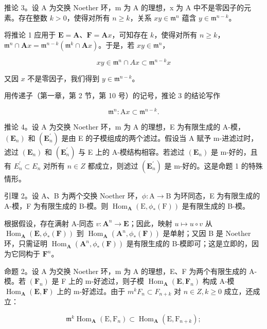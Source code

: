 推论 3。设 A 为交换 Noether 环，m 为 A 的理想，x 为 A 中不是零因子的元素。存在整数 \(k > 0\)，使得对所有 \(n \geqslant k\)，关系 \(xy \in \mathfrak{m}^n\) 蕴含 \(y \in \mathfrak{m}^{n - k}\)。

将推论 1 应用于 \(\mathbf{E} = \mathbf{A}\)、\(\mathbf{F} = \mathbf{A}x\)，可知存在 \(k\)，使得对所有 \(n \geqslant k\)，\(\mathfrak{m}^n \cap \mathbf{A}x = \mathfrak{m}^{n - k}(\mathfrak{m}^k \cap \mathbf{A}x)\)。于是，若 \(xy \in \mathfrak{m}^n\)，

\[
x y \in \mathfrak {m} ^ {n} \cap A x \subset \mathfrak {m} ^ {n - k} x
\]

又因 \(x\) 不是零因子，我们得到 \(y \in \mathfrak{m}^{n - k}\)。

用传递子（第一章，第 2 节，第 10 号）的记号，推论 3 的结论写作

\[
\mathfrak {m} ^ {n}: \mathrm{A} x \subset \mathfrak {m} ^ {n - k}.\tag{2}
\]

推论 4。设 A 为交换 Noether 环，m 为 A 的理想，E 为有限生成的 A-模，\((\mathbf{E}_{n})\) 和 \((\mathbf{E}_{n}^{\prime})\) 是由 E 的子模组成的两个滤过。假设当 A 赋予 m-进滤过时，滤过 \((\mathbf{E}_{n})\) 和 \((\mathbf{E}_{n}^{\prime})\) 与 E 上的 A-模结构相容。若滤过 \((\mathbf{E}_{n})\) 是 m-好的，且有 \(E_{n}^{\prime} \subset E_{n}\) 对所有 \(n \in Z\) 都成立，则滤过 \((\mathbf{E}_{n}^{\prime})\) 是 m-好的。这是命题 1 的特殊情形。

引理 2。设 A、B 为两个交换 Noether 环，\(\phi: \mathrm{A} \to \mathrm{B}\) 为环同态，E 为有限生成的 A-模，F 为有限生成的 B-模。则 \(\operatorname{Hom}_{\mathbf{A}}(\mathrm{E}, \phi_*(\mathrm{F}))\) 是有限生成的 B-模。

根据假设，存在满射 A-同态 \(v: \mathbf{A}^n \to \mathbf{E}\)；因此，映射 \(u \mapsto u \circ v\) 从 \(\operatorname{Hom}_{\mathbf{A}}(\mathbf{E}, \phi_*(\mathbf{F}))\) 到 \(\operatorname{Hom}_{\mathbf{A}}(\mathbf{A}^n, \phi_*(\mathbf{F}))\) 是单射；又因 B 是 Noether 环，只需证明 \(\operatorname{Hom}_{\mathbf{A}}(\mathbf{A}^n, \phi_*(\mathbf{F}))\) 是有限生成的 B-模即可；这是立即的，因为它同构于 \(\mathbf{F}^n\)。

命题 2。设 A 为交换 Noether 环，m 为 A 的理想，E、F 为两个有限生成的 A-模。若 \((\mathbf{F}_{n})\) 是 F 上的 m-好滤过，则子模 \(\operatorname{Hom}_{\mathbf{A}}(\mathbf{E}, \mathbf{F}_{n})\) 构成 A-模 \(\operatorname{Hom}_{\mathbf{A}}(\mathbf{E}, \mathbf{F})\) 上的 m-好滤过。由于 \(m^{k}F_{n}\subset F_{n+k}\) 对 \(n\in Z, k\geqslant0\) 成立，还成立：

\[
\mathfrak {m} ^ {k} \operatorname{Hom} _ {\mathbf {A}} (\mathrm{E}, \mathrm{F} _ {n}) \subset \operatorname{Hom} _ {\mathbf {A}} (\mathrm{E}, \mathrm{F} _ {n + k});
\]

